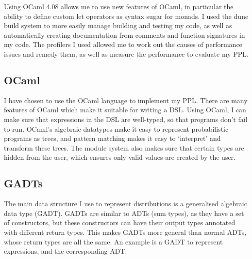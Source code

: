 Using OCaml 4.08 allows me to use new features of OCaml, in particular the ability to define custom let operators as syntax sugar for monads. I used the dune build system to more easily manage building and testing my code, as well as automatically creating documentation from comments and function signatures in my code. The profilers I used allowed me to work out the causes of performance issues and remedy them, as well as measure the performance to evaluate my PPL.

\subsection{OCaml}
I have chosen to use the OCaml language to implement my PPL. There are many features of OCaml which make it suitable for writing a DSL. Using OCaml, I can make sure that expressions in the DSL are well-typed, so that programs don't fail to run. OCaml's algebraic datatypes make it easy to represent probabilistic programs as trees, and pattern matching makes it easy to `interpret' and transform these trees. The module system also makes sure that certain types are hidden from the user, which ensures only valid values are created by the user.

\subsection{GADTs}
The main data structure I use to represent distributions is a generalised algebraic data type (GADT). GADTs are similar to ADTs (sum types), as they have a set of constructors, but these constructors can have their output types annotated with different return types. This makes GADTs more general than normal ADTs, whose return types are all the same. An example is a GADT to represent expressions, and the corresponding ADT:


